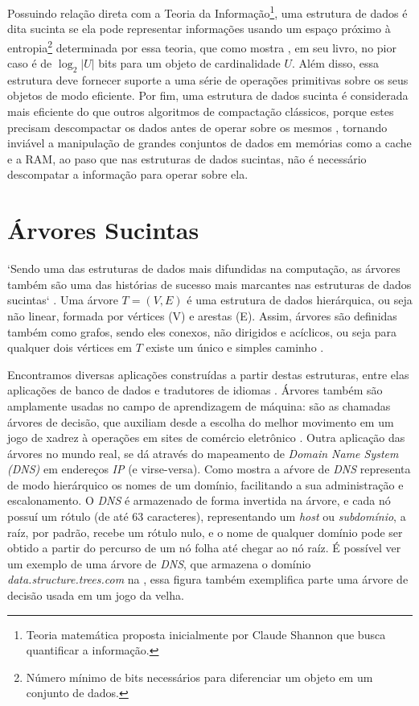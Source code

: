 Possuindo relação direta com a Teoria da Informação\footnote{Teoria matemática proposta inicialmente por Claude Shannon que busca quantificar a informação.}, uma estrutura de dados é dita sucinta se ela pode representar informações usando um espaço próximo à entropia\footnote{Número mínimo de bits necessários para diferenciar um objeto em um conjunto de dados.} determinada por essa teoria, que como mostra \cite{book-compact-data-structures},  em seu livro, no pior caso é de $\log_2 |U|$ bits para um objeto de cardinalidade $U$. Além disso, essa estrutura deve fornecer suporte a uma série de operações primitivas sobre os seus objetos de modo eficiente. Por fim, uma estrutura de dados sucinta é considerada mais eficiente do que outros algoritmos de compactação clássicos, porque estes precisam descompactar os dados antes de operar sobre os mesmos \citep{coira-feranando}, tornando inviável a manipulação de grandes conjuntos de dados em memórias como a cache e a RAM, ao paso que nas estruturas de dados sucintas, não é necessário descompatar a informação para operar sobre ela.


\section{Árvores Sucintas}
`Sendo uma das estruturas de dados mais difundidas na computação, as árvores também são uma das histórias de sucesso mais marcantes nas estruturas de dados sucintas` \cite[tradução nossa]{book-compact-data-structures}. Uma árvore $T=(V,E)$ é uma estrutura de dados hierárquica, ou seja não linear, formada por vértices (V) e arestas (E). Assim, árvores são definidas também como grafos, sendo eles conexos, não dirigidos e acíclicos, ou seja para qualquer dois vértices em $T$ existe um único e simples caminho \citep{book-algoritmos-teoria-pratica}.

 
Encontramos diversas aplicações construídas a partir destas estruturas, entre elas aplicações de banco de dados e tradutores de idiomas \citep{book-algoritmos-teoria-pratica}. Árvores também são amplamente usadas no campo de aprendizagem de máquina: são as chamadas árvores de decisão, que auxiliam desde a escolha do melhor movimento em um jogo de xadrez  à operações em sites de comércio eletrônico \citep{book-inteligencia-artificial}. Outra aplicação das árvores no mundo real, se dá através do mapeamento de \textit{Domain Name System (DNS)} em endereços \textit{IP} (e virse-versa). Como mostra  \citep{arvore-dns}  a aŕvore de \textit{DNS} representa de modo hierárquico os nomes de um domínio, facilitando a sua administração e escalonamento. O \textit{DNS} é armazenado de forma invertida na árvore, e cada nó possuí um rótulo (de até $63$ caracteres), representando um \textit{host} ou \textit{subdomínio}, a raíz, por padrão, recebe um rótulo nulo, e o nome de qualquer domínio pode ser obtido a partir do percurso de um nó folha até chegar ao nó raíz. É possível ver um exemplo de uma árvore de \textit{DNS},  que armazena o domínio \textit{data.structure.trees.com} na , essa figura também exemplifica parte uma árvore de decisão usada em um jogo da velha.

